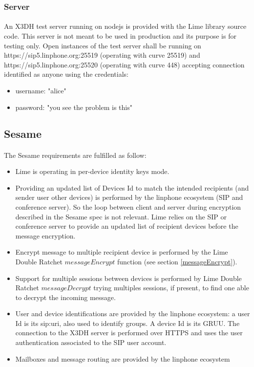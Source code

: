 \documentclass[a4paper,11pt]{article}
\begin{document}
    \subsubsection{Server}
      \paragraph*{}An X3DH test server running on nodejs is provided with the Lime library source code. This server is not meant to be used in production and its purpose is for testing only. Open instances of the test server shall be running on https://sip5.linphone.org:25519 (operating with curve 25519) and https://sip5.linphone.org:25520 (operating with curve 448) accepting connection identified as anyone using the credentials:
      \begin{itemize}
        \item username: "alice"
        \item password: "you see the problem is this"
      \end{itemize}

  \subsection{Sesame}
    \paragraph{}The Sesame requirements are fulfilled as follow:
    \begin{itemize}
      \item Lime is operating in per-device identity keys mode.
      \item Providing an updated list of Devices Id to match the intended recipients (and sender user other devices) is performed by the linphone ecosystem (SIP and conference server). So the loop between client and server during encryption described in the Sesame spec\cite{sesame} is not relevant. Lime relies on the SIP or conference server to provide an updated list of recipient devices before the message encryption.
      \item Encrypt message to multiple recipient device is performed by the Lime Double Ratchet $messageEncrypt$ function (see section \ref{messageEncrypt}).
      \item Support for multiple sessions between devices is performed by Lime Double Ratchet $messageDecrypt$ trying multiples sessions, if present, to find one able to decrypt the incoming message.
      \item User and device identifications are provided by the linphone ecosystem: a user Id is its sip:uri, also used to identify groups. A device Id is its GRUU\cite{rfc5627}. The connection to the X3DH server is performed over HTTPS and uses the user authentication associated to the SIP user account.
      \item Mailboxes and message routing are provided by the linphone ecosystem
    \end{itemize}
   
\end{document}
